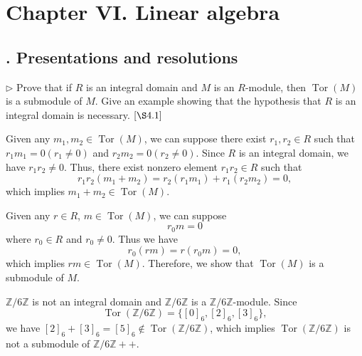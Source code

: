 \documentclass[12pt,letterpaper,boxed]{hmcpset}
\begin{document}
   \newpage
\section{Chapter VI.\hspace{0.2em} Linear algebra}
\subsection{. Presentations and resolutions}
\begin{problem}[4.1]
$\triangleright$ Prove that if $R$ is an integral domain and $M$ is an $R$-module, then $\operatorname{Tor}(M)$ is a submodule of $M$. Give an example showing that the hypothesis that $R$ is an integral domain is necessary. $[\S 4.1]$
\end{problem}
\begin{solution}
Given any $m_1,m_2\in\operatorname{Tor}(M)$, we can suppose there exist $r_1,r_2\in R$ such that $r_1m_1=0(r_1\ne0)$ and $r_2m_2=0(r_2\ne0)$. Since $R$ is an integral domain, we have $r_1r_2\ne0$. Thus, there exist nonzero element $r_1r_2\in R$ such that 
$$
r_1r_2(m_1+m_2)=r_2(r_1m_1)+r_1(r_2m_2)=0,
$$
which implies $m_1+m_2\in\operatorname{Tor}(M)$.

Given any $r\in R$, $m\in\operatorname{Tor}(M)$, we can suppose
\[
r_0m=0
\]
where $r_0\in R$ and $r_0\ne0$. Thus we have
\[
r_0(rm)=r(r_0m)=0,
\]
which implies $rm\in\operatorname{Tor}(M)$. Therefore, we show that $\operatorname{Tor}(M)$ is a submodule of $M$.

$\mathbb{Z}/6\mathbb{Z}$ is not an integral domain and $\mathbb{Z}/6\mathbb{Z}$ is a $\mathbb{Z}/6\mathbb{Z}$-module. Since
\[
\operatorname{Tor}(\mathbb{Z}/6\mathbb{Z})=\{[0]_6,[2]_6,[3]_6\},
\]
we have $[2]_6+[3]_6=[5]_6\notin \operatorname{Tor}(\mathbb{Z}/6\mathbb{Z})$, which implies $\operatorname{Tor}(\mathbb{Z}/6\mathbb{Z})$ is not a submodule of $\mathbb{Z}/6\mathbb{Z}
++$.
\end{solution}
\end{document}
